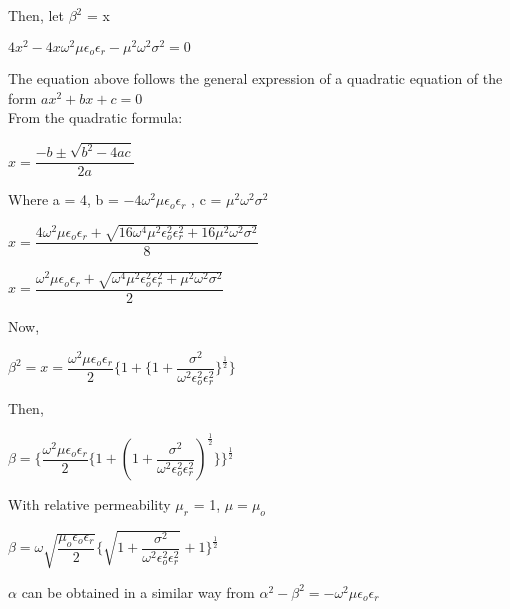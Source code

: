 Then, let $\beta^{2}$ = x
\begin{center}
$4x^{2} -4x\omega^{2}\mu\epsilon_{o}\epsilon_{r} - \mu^{2}\omega^{2}\sigma^{2} = 0$
\end{center}
The equation above follows the general expression of a quadratic equation of the form $ax^2 + bx + c = 0$
\\
From the quadratic formula:

\begin{center}
$x = \dfrac{-b\pm \sqrt{b^{2} - 4ac}}{2a}$
\end{center}

Where a = 4, b = $-4\omega^{2}\mu\epsilon_{o}\epsilon_{r}$ , c = $\mu^{2}\omega^{2}\sigma^{2}$

\begin{center}
$x = \dfrac{4\omega^{2}\mu\epsilon_{o}\epsilon_{r} + \sqrt{16\omega^{4}\mu^{2}\epsilon_{o}^{2}\epsilon_{r}^{2} + 16\mu^{2}\omega^{2}\sigma^{2}}}{8}$
\end{center}

\begin{center}
$x = \dfrac{\omega^{2}\mu\epsilon_{o}\epsilon_{r} + \sqrt{\omega^{4}\mu^{2}\epsilon_{o}^{2}\epsilon_{r}^{2} + \mu^{2}\omega^{2}\sigma^{2}}}{2}$
\end{center}

Now,
\begin{center}
$\beta^{2} = x = \dfrac{\omega^{2}\mu\epsilon_{o}\epsilon_{r}}{2}\Bigg\{1 + \bigg\{1 + \dfrac{\sigma^{2}}{\omega^{2}\epsilon_{o}^{2}\epsilon_{r}^{2}}\bigg\}^{\frac{1}{2}}\Bigg\}$
\end{center}

Then,

\begin{center}
$\beta =\Bigg\{ \dfrac{\omega^{2}\mu\epsilon_{o}\epsilon_{r}}{2}\bigg\{1 + (1 + \dfrac{\sigma^{2}}{\omega^{2}\epsilon_{o}^{2}\epsilon_{r}^{2}})^{\frac{1}{2}}\bigg\}\Bigg\}^{\frac{1}{2}}$
\end{center}

With relative permeability $\mu_{r}$ = 1, $\mu = \mu_{o}$

\begin{center}
$\beta = \omega\sqrt{\dfrac{\mu_{o}\epsilon_{o}\epsilon_{r}}{2}}\Bigg\{{\sqrt{1 + \dfrac{\sigma^{2}}{\omega^{2}\epsilon_{o}^{2}\epsilon_{r}^{2}}}} + 1\Bigg\}^{\frac{1}{2}}$
\end{center}

$\alpha$ can be obtained in a similar way from $\alpha^{2} - \beta^{2} = -\omega^{2}\mu\epsilon_{o}\epsilon_{r}$


